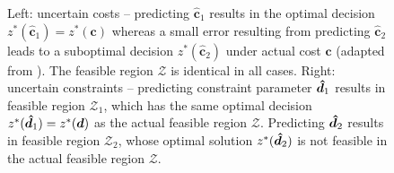 \begin{figure}[ht]
    \centering
    
    \begin{minipage}{.45\linewidth}
    
    \end{minipage}
    \hfill
    \begin{minipage}{.45\linewidth}
    
    \end{minipage}
    
    \caption{
    Left: uncertain costs -- predicting $\hat{\bm{c}}_1$ results in the optimal decision $z^*(\hat{\bm{c}}_1) = z^*(\bm{c})$ whereas a small error resulting from predicting $\hat{\bm{c}}_2$ leads to a suboptimal decision $z^*(\hat{\bm{c}}_2)$ under actual cost $\bm{c}$ (adapted from \cite{sadanaSurveyContextualOptimization2023}). The feasible region $\mathcal{Z}$ is identical in all cases.\newline\newline%
%
    Right: uncertain constraints -- predicting constraint parameter ${\bm{\hat{d}}}_1$ results in feasible region $\mathcal{Z}_1$, which has the same optimal decision $z^*({\bm{\hat{d}}}_1) = z^*({\bm{d}})$ as the actual feasible region $\mathcal{Z}$. Predicting ${\bm{\hat{d}}}_2$ results in feasible region $\mathcal{Z}_2$, whose optimal solution $z^*({\bm{\hat{d}}}_2)$ is not feasible in the actual feasible region $\mathcal{Z}$.
    }
    \label{fig:methodology:regret-issues}
\end{figure}


